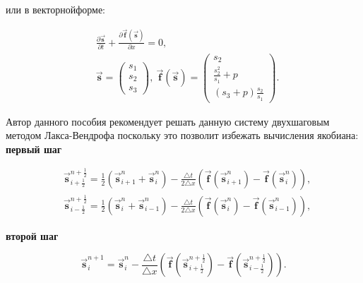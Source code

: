 \documentclass[12pt,a4paper]{article}
\begin{document}
	или в векторнойформе:

	\begin{equation}
		\begin{split}
			&\frac{\partial \vec{\textbf{s}}}{\partial t} + \frac{\partial \vec{\textbf{f}} \left( \vec{\textbf{s}} \right)}{\partial x} = 0, \\
			&\vec{\textbf{s}} =
				\begin{pmatrix}
					s_{1} \\
					s_{2} \\
					s_{3}
				\end{pmatrix}, \:
			\vec{\textbf{f}} \left( \vec{\textbf{s}}\right) =
				\begin{pmatrix}
					s_{2} \\
					\frac{s^{2}_{2}}{s_{1}} + p \\
					\left( s_{3} + p \right) \frac{s_{2}}{s_{1}}
				\end{pmatrix}.			
		\end{split}
	\end{equation}

	Автор данного пособия рекомендует решать данную систему двухшаговым методом Лакса-Вендрофа поскольку это позволит избежать вычисления якобиана:\\

	\textbf{первый шаг}

	\begin{equation}
		\begin{split}
			&\vec{\textbf{s}}^{n+\frac{1}{2}}_{i+\frac{1}{2}} = \frac{1}{2} \left( \vec{\textbf{s}}^{n}_{i+1} + \vec{\textbf{s}}^{n}_{i} \right) - \frac{\triangle t}{2 \triangle x} \left( \vec{\textbf{f}} \left( \vec{\textbf{s}}^{n}_{i+1} \right) - \vec{\textbf{f}} \left( \vec{\textbf{s}}^{n}_{i} \right) \right), \\
			&\vec{\textbf{s}}^{n+\frac{1}{2}}_{i-\frac{1}{2}} = \frac{1}{2} \left( \vec{\textbf{s}}^{n}_{i} + \vec{\textbf{s}}^{n}_{i-1} \right) - \frac{\triangle t}{2 \triangle x} \left( \vec{\textbf{f}} \left( \vec{\textbf{s}}^{n}_{i} \right) - \vec{\textbf{f}} \left( \vec{\textbf{s}}^{n}_{i-1} \right) \right),
		\end{split}
	\end{equation}

	\textbf{второй шаг}

	\begin{equation}
		\vec{\textbf{s}}^{n+1}_{i} = \vec{\textbf{s}}^{n}_{i} - \frac{\triangle t}{\triangle x} \left( \vec{\textbf{f}} \left( \vec{\textbf{s}}^{n+\frac{1}{2}}_{i+\frac{1}{2}} \right) - \vec{\textbf{f}} \left( \vec{\textbf{s}}^{n+\frac{1}{2}}_{i-\frac{1}{2}} \right) \right).
	\end{equation}
\end{document}
